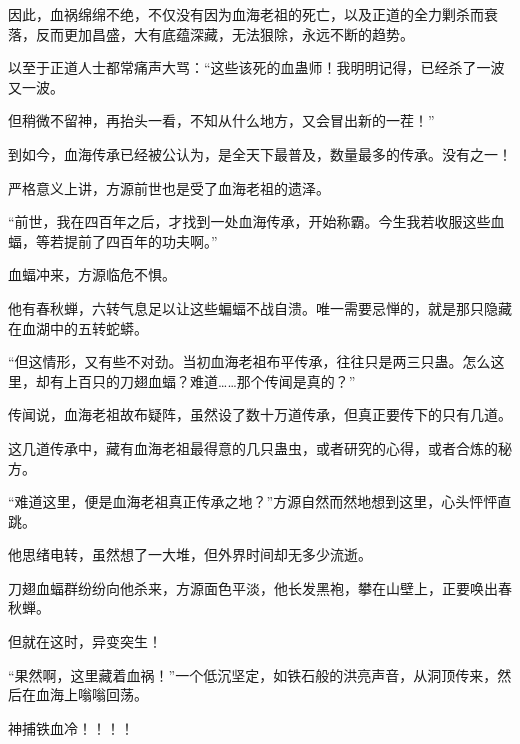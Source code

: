 \begin{this_body}
因此，血祸绵绵不绝，不仅没有因为血海老祖的死亡，以及正道的全力剿杀而衰落，反而更加昌盛，大有底蕴深藏，无法狠除，永远不断的趋势。

以至于正道人士都常痛声大骂：“这些该死的血蛊师！我明明记得，已经杀了一波又一波。

但稍微不留神，再抬头一看，不知从什么地方，又会冒出新的一茬！”

到如今，血海传承已经被公认为，是全天下最普及，数量最多的传承。没有之一！

严格意义上讲，方源前世也是受了血海老祖的遗泽。

“前世，我在四百年之后，才找到一处血海传承，开始称霸。今生我若收服这些血蝠，等若提前了四百年的功夫啊。”

血蝠冲来，方源临危不惧。

他有春秋蝉，六转气息足以让这些蝙蝠不战自溃。唯一需要忌惮的，就是那只隐藏在血湖中的五转蛇蟒。

“但这情形，又有些不对劲。当初血海老祖布平传承，往往只是两三只蛊。怎么这里，却有上百只的刀翅血蝠？难道……那个传闻是真的？”

传闻说，血海老祖故布疑阵，虽然设了数十万道传承，但真正要传下的只有几道。

这几道传承中，藏有血海老祖最得意的几只蛊虫，或者研究的心得，或者合炼的秘方。

“难道这里，便是血海老祖真正传承之地？”方源自然而然地想到这里，心头怦怦直跳。

他思绪电转，虽然想了一大堆，但外界时间却无多少流逝。

刀翅血蝠群纷纷向他杀来，方源面色平淡，他长发黑袍，攀在山壁上，正要唤出春秋蝉。

但就在这时，异变突生！

“果然啊，这里藏着血祸！”一个低沉坚定，如铁石般的洪亮声音，从洞顶传来，然后在血海上嗡嗡回荡。

神捕铁血冷！！！！

\end{this_body}

